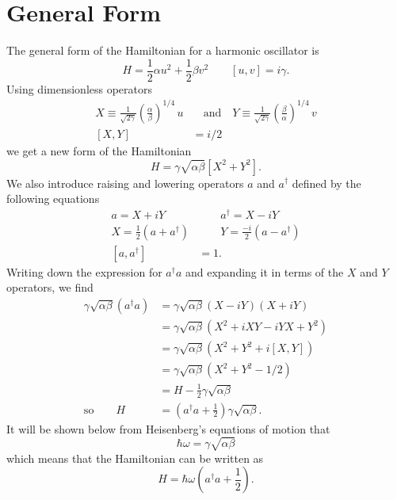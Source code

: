 \section{General Form}

The general form of the Hamiltonian for a harmonic oscillator is \begin{equation}
H = \frac{1}{2} \alpha u^2 + \frac{1}{2} \beta v^2 \qquad [u,v]= i \gamma . \end{equation}
Using dimensionless operators \begin{align}
X \equiv \frac{1}{\sqrt{2 \gamma}} \left( \frac{\alpha}{\beta}\right)^{1/4}\,u &\quad \textrm{and} \quad Y \equiv \frac{1}{\sqrt{2 \gamma}} \left( \frac{\beta}{\alpha} \right)^{1/4}\,v \\
[X,Y] &= i/2 \end{align}
we get a new form of the Hamiltonian \begin{equation}
H = \gamma \sqrt{\alpha \beta} \left[ X^{2} + Y^{2} \right] .
\end{equation}
We also introduce raising and lowering operators $a$ and $a^{\dagger}$ defined by the following equations \begin{align}
a = X+iY &\qquad a^{\dagger} = X-iY \nonumber \\
X = \frac{1}{2}\left(a+a^{\dagger}\right) &\qquad Y = \frac{-i}{2}\left(a-a^{\dagger}\right) \\
[ a, a^{\dagger} ] &= 1 . \end{align}
Writing down the expression for $a^{\dagger}a$ and expanding it in terms of the $X$ and $Y$ operators, we find \begin{align*}
\gamma \sqrt{\alpha \beta} ( a^{\dagger} a ) & = \gamma\sqrt{\alpha\beta} (X-iY)(X+iY)\\
 & = \gamma\sqrt{\alpha\beta} \left(X^2 + iXY - iYX + Y^2 \right)\\
 & = \gamma\sqrt{\alpha\beta} \left(X^2 + Y^{2} + i \left[ X,Y \right] \right)\\
 & = \gamma\sqrt{\alpha\beta} \left(X^2 + Y^{2} - 1/2 \right)\\
 & = H - \frac{1}{2}\gamma\sqrt{\alpha\beta} \\
\textrm{so}\qquad H & = \left( a^{\dagger}a + \frac{1}{2} \right) \gamma\sqrt{\alpha\beta}. \end{align*}
It will be shown below from Heisenberg's equations of motion that \begin{equation}
\hbar\omega=\gamma\sqrt{\alpha\beta} \end{equation}
which means that the Hamiltonian can be written as \begin{equation}
H=\hbar\omega\left(a^{\dagger}a+\frac{1}{2}\right). \end{equation}

